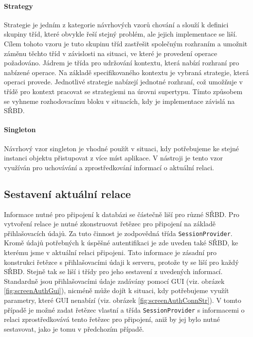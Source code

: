 \documentclass[czech,bachelor,public,dept460,male,oneside]{diploma}
\begin{document}
			\paragraph{Strategy} \label{secStrategy}
			Strategie je jedním z kategorie návrhových vzorů chování a slouží k definici skupiny tříd, které obvykle řeší stejný problém, ale jejich implementace se liší. Cílem tohoto vzoru je tuto skupinu tříd zastřešit společným rozhraním a umožnit záměnu těchto tříd v závislosti na situaci, ve které je provedení operace požadováno. Jádrem je třída pro udržování kontextu, která nabízí rozhraní pro nabízené operace. Na základě specifikovaného kontextu je vybraná strategie, která operaci provede. Jednotlivé strategie nabízejí jednotné rozhraní, což umožňuje v třídě pro kontext pracovat se strategiemi na úrovni supertypu. Tímto způsobem se vyhneme rozhodovacímu bloku v situacích, kdy je implementace závislá na SŘBD.
			
			\paragraph{Singleton}
			Návrhový vzor singleton je vhodné použít v situaci, kdy potřebujeme ke stejné instanci objektu přistupovat z více míst aplikace. V nástroji je tento vzor využíván pro uchovávání a zprostředkování informací o aktuální relaci. 
	
	\subsection{Sestavení aktuální relace}
	Informace nutné pro připojení k databázi se částečně liší pro různé SŘBD. Pro vytvoření relace je nutné zkonstruovat řetězec pro připojení na základě přihlašovacích údajů. Za tuto činnost je zodpovědná třída \texttt{SessionProvider}. Kromě údajů potřebných k úspěšné autentifikaci je zde uveden také SŘBD, ke kterému jsme v aktuální relaci připojeni. Tato informace je zásadní pro konstrukci řetězce s přihlašovacími údaji k serveru, protože ty se liší pro každý SŘBD. Stejně tak se liší i třídy pro jeho sestavení z uvedených informací. Standardně jsou přihlašovacími údaje zadávány pomocí GUI (viz. obrázek \ref{fig:screenAuthGui}), nicméně může dojít k situaci, kdy potřebujeme využít parametry, které GUI nenabízí (viz. obrázek \ref{fig:screenAuthConnStr}). V tomto případě je možné zadat řetězec vlastní a třída \texttt{SessionProvider} s informacemi o relaci zprostředkovává tento řetězec pro připojení, aniž by jej bylo nutné sestavovat, jako je tomu v předchozím případě.
	
\end{document}
